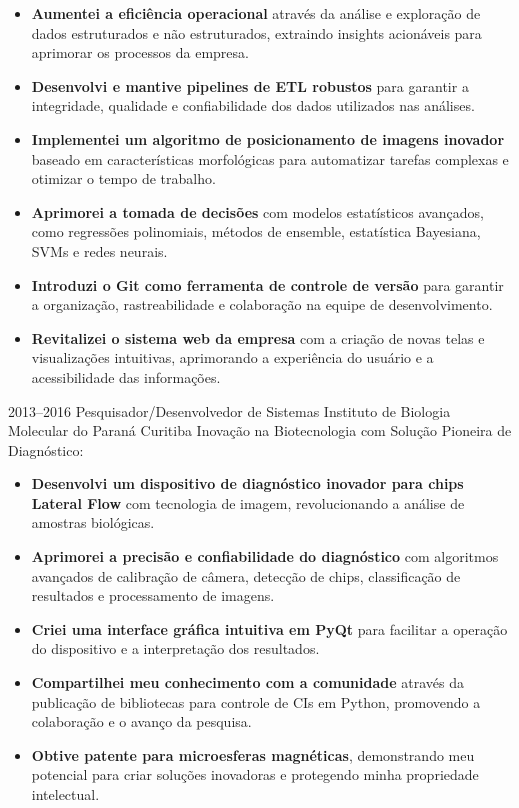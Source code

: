 \documentclass[11pt,a4paper,sans]{moderncv}        %
\begin{document}
\begin{itemize}%
  \item \textbf{Aumentei a eficiência operacional} através da análise e exploração de dados estruturados e não estruturados, extraindo insights acionáveis para aprimorar os processos da empresa.
  \item \textbf{Desenvolvi e mantive pipelines de ETL robustos} para garantir a integridade, qualidade e confiabilidade dos dados utilizados nas análises.
  \item \textbf{Implementei um algoritmo de posicionamento de imagens inovador} baseado em características morfológicas para automatizar tarefas complexas e otimizar o tempo de trabalho.
  \item \textbf{Aprimorei a tomada de decisões} com modelos estatísticos avançados, como regressões polinomiais, métodos de ensemble, estatística Bayesiana, SVMs e redes neurais.
  \item \textbf{Introduzi o Git como ferramenta de controle de versão} para garantir a organização, rastreabilidade e colaboração na equipe de desenvolvimento.
  \item \textbf{Revitalizei o sistema web da empresa} com a criação de novas telas e visualizações intuitivas, aprimorando a experiência do usuário e a acessibilidade das informações.
\end{itemize}

\vspace{1em}
\cventry
{2013--2016}
{Pesquisador/Desenvolvedor de Sistemas}
{Instituto de Biologia Molecular do Paraná}
{Curitiba}{}
{Inovação na Biotecnologia com Solução Pioneira de Diagnóstico:}

\begin{itemize}%
  \item \textbf{Desenvolvi um dispositivo de diagnóstico inovador para chips Lateral Flow} com tecnologia de imagem, revolucionando a análise de amostras biológicas.
  \item \textbf{Aprimorei a precisão e confiabilidade do diagnóstico} com algoritmos avançados de calibração de câmera, detecção de chips, classificação de resultados e processamento de imagens.
  \item \textbf{Criei uma interface gráfica intuitiva em PyQt} para facilitar a operação do dispositivo e a interpretação dos resultados.
  \item \textbf{Compartilhei meu conhecimento com a comunidade} através da publicação de bibliotecas para controle de CIs em Python, promovendo a colaboração e o avanço da pesquisa.
  \item \textbf{Obtive patente para microesferas magnéticas}, demonstrando meu potencial para criar soluções inovadoras e protegendo minha propriedade intelectual.
\end{itemize}
\end{document}
